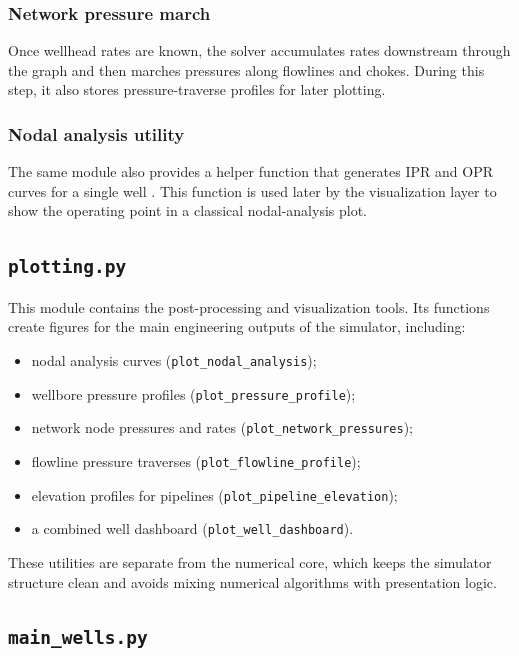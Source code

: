 \subsubsection*{Network pressure march}

Once wellhead rates are known, the solver accumulates rates downstream through
the graph and then marches pressures along flowlines and chokes. During this
step, it also stores pressure-traverse profiles for later plotting.

\subsubsection*{Nodal analysis utility}

The same module also provides a helper function that generates IPR and OPR
curves for a single well \cite{brown_nodal_1985}. This function is used later by the
visualization layer to show the operating point in a classical nodal-analysis
plot.

\subsection*{\texttt{plotting.py}}

This module contains the post-processing and visualization tools. Its functions
create figures for the main engineering outputs of the simulator, including:

\begin{itemize}
    \item nodal analysis curves (\texttt{plot\_nodal\_analysis});
    \item wellbore pressure profiles (\texttt{plot\_pressure\_profile});
    \item network node pressures and rates (\texttt{plot\_network\_pressures});
    \item flowline pressure traverses (\texttt{plot\_flowline\_profile});
    \item elevation profiles for pipelines (\texttt{plot\_pipeline\_elevation});
    \item a combined well dashboard (\texttt{plot\_well\_dashboard}).
\end{itemize}

These utilities are separate from the numerical core, which keeps the simulator
structure clean and avoids mixing numerical algorithms with presentation logic.

\subsection*{\texttt{main\_wells.py}}

